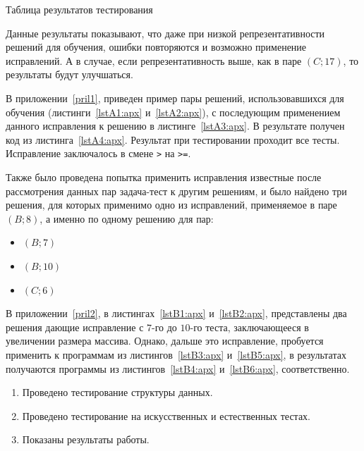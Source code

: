 \begin{table}[!h]
\caption{Таблица результатов тестирования}\label{tab1}
\centering
{}
\end{table}

Данные результаты показывают, что даже при низкой репрезентативности решений для обучения, ошибки повторяются и возможно применение
исправлений. А в случае, если репрезентативность выше, как в паре $(C;17)$, то результаты будут улучшаться.

В приложении~\ref{pril1}, приведен пример пары решений, использовавшихся для обучения (листинги~\ref{lstA1:apx} и~\ref{lstA2:apx}),
с последующим применением данного исправления к решению в листинге~\ref{lstA3:apx}. 
В результате получен код из листинга~\ref{lstA4:apx}. Результат при тестировании проходит все тесты. Исправление заключалось в смене
\texttt{>} на \texttt{>=}.

Также было проведена попытка применить исправления известные после рассмотрения данных пар задача-тест к другим решениям, и было
найдено три решения, для которых применимо одно из исправлений, применяемое в паре $(B;8)$, а именно по одному решению для пар:
\begin{itemize}
\item $(B;7)$
\item $(B;10)$
\item $(C;6)$
\end{itemize}

В приложении~\ref{pril2}, в листингах~\ref{lstB1:apx} и~\ref{lstB2:apx}, представлены два решения дающие исправление
с $7$-го до $10$-го теста, заключающееся в увеличении размера массива.
Однако, дальше это исправление, пробуется применить к программам из листингов~\ref{lstB3:apx} и~\ref{lstB5:apx}, в результатах
получаются программы из листингов~\ref{lstB4:apx} и~\ref{lstB6:apx}, соответственно. 

\chapterconclusion

\begin{enumerate}
    \item Проведено тестирование структуры данных.
    \item Проведено тестирование на искусственных и естественных тестах.
    \item Показаны результаты работы.
\end{enumerate}

